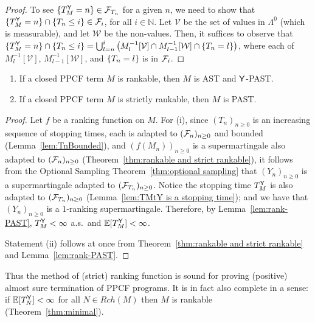 \begin{proof}
To see $\{T_M^{\mathsf{Y}} = n\} \in \mathcal{F}_{T_n}$ for a given $n$, we need to show that $\{T_M^{\mathsf{Y}} = n\} \cap \{T_n \leq i\} \in \mathcal{F}_i$, for all $i \in \mathbb N$.
Let $\mathcal V$ be the set of values in $\Lambda^0$ (which is measurable), and let $\mathcal W$ be the non-values.
Then, it suffices to observe that $\{T_M^{\mathsf{Y}} = n\} \cap \{T_n \leq i\}
= \bigcup_{l=n}^i 
\big( M_l^{-1} [{\mathcal V}] \cap  
M_{l-1}^{-1} [{\mathcal W}] \cap 
\{T_n = l\} \big)
$, where each of $M_l^{-1} [{\mathcal V}]$, $M_{l-1}^{-1} [{\mathcal W}]$, and $\{T_n = l\}$ is in $\mathcal{F}_i$.
\end{proof}

\begin{therm} \label{thm:rankable implies termination}
\begin{enumerate}
\item If a closed PPCF term $M$ is rankable, then $M$ is AST and $\mathsf{Y}$-PAST.

\item If a closed PPCF term $M$ is strictly rankable, then $M$ is PAST.
\end{enumerate}
\end{therm}


\begin{proof}
Let $f$ be a ranking function on $M$.
For (i), since $(T_n)_{n \geq 0}$ is an increasing sequence of stopping times, each is adapted to $(\mathcal{F}_n)_{n \geq 0}$ and bounded (Lemma~\ref{lem:TnBounded}),
and $(f(M_n))_{n \geq 0}$ is a supermartingale also adapted to $(\mathcal{F}_n)_{n \geq 0}$ (Theorem~\ref{thm:rankable and strict rankable}),
it follows from the Optional Sampling Theorem~\ref{thm:optional sampling} that $(Y_n)_{n \geq 0}$ %
is a supermartingale adapted to $(\mathcal{F}_{T_n})_{n \geq 0}$.
Notice the stopping time $T_M^{\mathsf{Y}}$ is also adapted to $(\mathcal{F}_{T_n})_{n \geq 0}$ (Lemma~\ref{lem:TMtY is a stopping time}); and we have that $(Y_n)_{n \geq 0}$ is a $1$-ranking supermartingale.
Therefore, by Lemma~\ref{lem:rank-PAST}, $T^{\mathsf{Y}}_M < \infty$ a.s.~and $\mathbb{E}[T^{\mathsf{Y}}_M] < \infty$.

Statement (ii) follows at once from Theorem~\ref{thm:rankable and strict rankable} and Lemma~\ref{lem:rank-PAST}.
\end{proof}

Thus the method of (strict) ranking function is sound for proving (positive) almost sure termination of PPCF programs.
It is in fact also complete in a sense: if $\mathbb{E}[T^{\mathsf{Y}}_N] < \infty$ for all $N \in \mathit{Rch}(M)$ then $M$ is rankable (Theorem~\ref{thm:minimal}).
